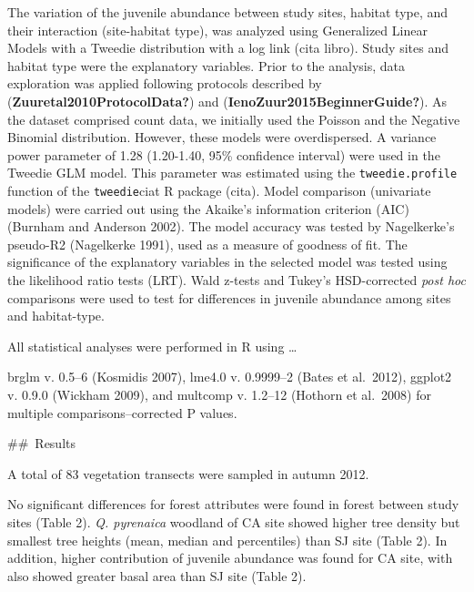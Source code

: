 \documentclass[
]{article}
\begin{document}
The variation of the juvenile abundance between study sites, habitat
type, and their interaction (site-habitat type), was analyzed using
Generalized Linear Models with a Tweedie distribution with a log link
(cita libro). Study sites and habitat type were the explanatory
variables. Prior to the analysis, data exploration was applied following
protocols described by (\textbf{Zuuretal2010ProtocolData?}) and
(\textbf{IenoZuur2015BeginnerGuide?}). As the dataset comprised count
data, we initially used the Poisson and the Negative Binomial
distribution. However, these models were overdispersed. A variance power
parameter of 1.28 (1.20-1.40, 95\% confidence interval) were used in the
Tweedie GLM model. This parameter was estimated using the
\texttt{tweedie.profile} function of the \texttt{tweedie}ciat R package
(cita). Model comparison (univariate models) were carried out using the
Akaike's information criterion (AIC) (Burnham and Anderson 2002). The
model accuracy was tested by Nagelkerke's pseudo-R2 (Nagelkerke 1991),
used as a measure of goodness of fit. The significance of the
explanatory variables in the selected model was tested using the
likelihood ratio tests (LRT). Wald z-tests and Tukey's HSD-corrected
\emph{post hoc} comparisons were used to test for differences in
juvenile abundance among sites and habitat-type.

All statistical analyses were performed in R using \ldots{}

brglm v. 0.5--6 (Kosmidis 2007), lme4.0 v. 0.9999--2 (Bates et
al.~2012), ggplot2 v. 0.9.0 (Wickham 2009), and multcomp v. 1.2--12
(Hothorn et al.~2008) for multiple comparisons--corrected P values.

\#\#~Results

A total of 83 vegetation transects were sampled in autumn 2012.

No significant differences for forest attributes were found in forest
between study sites (Table 2). \emph{Q. pyrenaica} woodland of CA site
showed higher tree density but smallest tree heights (mean, median and
percentiles) than SJ site (Table 2). In addition, higher contribution of
juvenile abundance was found for CA site, with also showed greater basal
area than SJ site (Table 2).
\end{document}
